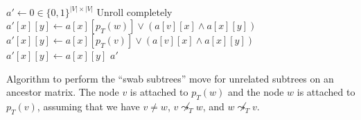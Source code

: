 \begin{algorithm}
    \begin{algorithmic}[1]
        \State $a' \leftarrow 0 \in \{0,1\}^{|V| \times |V|}$
             \Comment Unroll completely
                    \State $a'[x][y] \leftarrow a[x][p_T(w)] \vee (a[v][x] \wedge a[x][y])$
                    \State $a'[x][y] \leftarrow a[x][p_T(v)] \vee (a[v][x] \wedge a[x][y])$
                \Else
                    \State $a'[x][y] \leftarrow a[x][y]$
                \EndIf
            \EndFor
        \EndFor
        \State \Return $a'$
        \EndFunction
    \end{algorithmic}
    \caption{Algorithm to perform the ``swab subtrees'' move for unrelated subtrees on an ancestor matrix. The node $v$ is attached to $p_T(w)$ and the node $w$ is attached to $p_T(v)$, assuming that we have $v \neq w$, $v \not\leadsto_T w$, and $w \not\leadsto_T v$.}
    \label{alg:am_swap_unrelated}
\end{algorithm}

